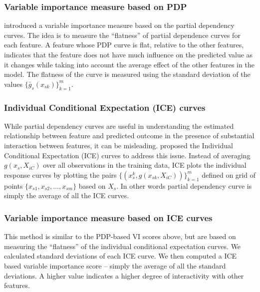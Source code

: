 \documentclass[11pt,a4paper,]{article}
\theoremstyle{definition}
\theoremstyle{definition}
\theoremstyle{definition}
\theoremstyle{remark}
\begin{document}
\subsubsection{Variable importance measure based on
PDP}\label{variable-importance-measure-based-on-pdp}

\textcite{Greenwell2018} introduced a variable importance measure based
on the partial dependency curves. The idea is to measure the
``flatness'' of partial dependence curves for each feature. A feature
whose PDP curve is flat, relative to the other features, indicates that
the feature does not have much influence on the predicted value as it
changes while taking into account the average effect of the other
features in the model. The flatness of the curve is measured using the
standard deviation of the values \(\{\bar{g}_{s}(x_{sk})\}_{k=1}^{m}\).

\subsubsection{Individual Conditional Expectation (ICE)
curves}\label{individual-conditional-expectation-ice-curves}

While partial dependency curves are useful in understanding the
estimated relationship between feature and predicted outcome in the
presence of substantial interaction between features, it can be
misleading. \textcite{goldstein2015peeking} proposed the Individual
Conditional Expectation (ICE) curves to address this issue. Instead of
averaging \(g(x_s, X_{iC})\) over all observations in the training data,
ICE plots the individual response curves by plotting the pairs
\(\{(x_s^k, g(x_{sk}, X_{iC}))\}_{k=1}^{m}\) defined on grid of points
\(\{x_{s1}, x_{s2},\dots, x_{sm}\}\) based on \(X_s\). In other words
partial dependency curve is simply the average of all the ICE curves.

\subsubsection{Variable importance measure based on ICE
curves}\label{variable-importance-measure-based-on-ice-curves}

This method is similar to the PDP-based VI scores above, but are based
on measuring the ``flatness'' of the individual conditional expectation
curves. We calculated standard deviations of each ICE curve. We then
computed a ICE based variable importance score -- simply the average of
all the standard deviations. A higher value indicates a higher degree of
interactivity with other features.
\end{document}
